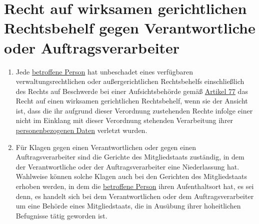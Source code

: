 \chapter{Recht auf wirksamen gerichtlichen Rechtsbehelf gegen Verantwortliche oder Auftragsverarbeiter}
\label{ch:79}


\begin{enumerate}

  \item Jede \hyperref[itm:04-1]{betroffene Person} hat unbeschadet eines verfügbaren verwaltungsrechtlichen oder außergerichtlichen
   Rechtsbehelfs einschließlich des Rechts auf Beschwerde bei einer Aufsichtsbehörde gemäß \hyperref[ch:77]{Artikel 77}
   das Recht auf einen wirksamen gerichtlichen Rechtsbehelf, wenn sie der Ansicht ist, dass die ihr aufgrund dieser
   Verordnung zustehenden Rechte infolge einer nicht im Einklang mit dieser Verordnung stehenden Verarbeitung ihrer
   \hyperref[itm:04-1]{personenbezogenen Daten} verletzt wurden.
  \label{itm:79-1}

  \item Für Klagen gegen einen Verantwortlichen oder gegen einen Auftragsverarbeiter sind die Gerichte des
   Mitgliedstaats zuständig, in dem der Verantwortliche oder der Auftragsverarbeiter eine Niederlassung hat. Wahlweise
   können solche Klagen auch bei den Gerichten des Mitgliedstaats erhoben werden, in dem die \hyperref[itm:04-1]{betroffene Person} ihren
   Aufenthaltsort hat, es sei denn, es handelt sich bei dem Verantwortlichen oder dem Auftragsverarbeiter um eine
   Behörde eines Mitgliedstaats, die in Ausübung ihrer hoheitlichen Befugnisse tätig geworden ist.
  \label{itm:79-2}

\end{enumerate}



